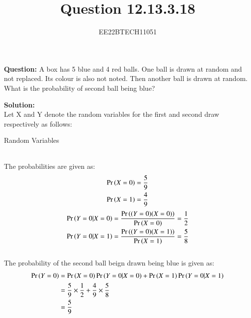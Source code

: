 \documentclass[journal,12pt,onecolumn]{IEEEtran}
\theoremstyle{remark}
\begin{document}

\vspace{3cm}


\title{Question 12.13.3.18}
\author{EE22BTECH11051}

\maketitle
\vspace{3cm}

\textbf{Question:} A box has 5 blue and 4 red balls. One ball is drawn at random and not replaced.
Its colour is also not noted. Then another ball is drawn at random. What is the
probability of second ball being blue?

\textbf{Solution:} \\
Let X and Y denote the random variables for the first and second draw respectively as follows:
\begin{table}[h]
    \centering
    
    \caption{Random Variables}
    \label{12.13.3.8_table_1}
    \end{table}
\\
The probabilities are given as:
\begin{align}
    \Pr\left(X = 0\right) = \frac{5}{9}\\
    \Pr\left(X = 1\right) = \frac{4}{9}
\end{align}
\begin{align}
    \Pr\left(Y = 0 | X = 0\right) = \frac{\Pr\left((Y = 0)(X = 0)\right)}{\Pr\left(X = 0\right)} = \frac{1}{2}\\
    \Pr\left(Y = 0 | X = 1\right) = \frac{\Pr\left((Y = 0)(X = 1)\right)}{\Pr\left(X = 1\right)} = \frac{5}{8}
\end{align}
    \\
The probability of the second ball beign drawn being blue is given as:
\begin{align}
\Pr\left(Y = 0\right) &= \Pr\left(X = 0\right)\Pr\left(Y = 0 | X = 0\right) + \Pr\left(X = 1\right)\Pr\left(Y = 0 | X = 1\right)\\
           &= {\frac{5}{9}}\times{\frac{1}{2}} + {\frac{4}{9}}\times{{\frac{5}{8}}}\\
           &= \frac{5}{9}
\end{align}
\end{document}
